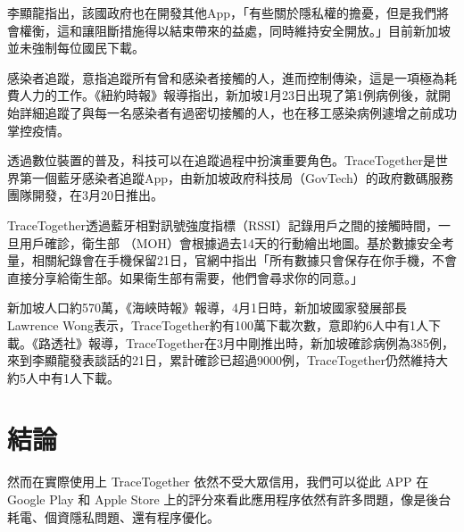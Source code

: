 \documentclass[12pt, a4paper]{report}
\begin{document}
李顯龍指出，該國政府也在開發其他App，「有些關於隱私權的擔憂，但是我們將會權衡，這和讓阻斷措施得以結束帶來的益處，同時維持安全開放。」目前新加坡並未強制每位國民下載。

感染者追蹤，意指追蹤所有曾和感染者接觸的人，進而控制傳染，這是一項極為耗費人力的工作。《紐約時報》報導指出，新加坡1月23日出現了第1例病例後，就開始詳細追蹤了與每一名感染者有過密切接觸的人，也在移工感染病例遽增之前成功掌控疫情。

透過數位裝置的普及，科技可以在追蹤過程中扮演重要角色。TraceTogether是世界第一個藍牙感染者追蹤App，由新加坡政府科技局（GovTech）的政府數碼服務團隊開發，在3月20日推出。

TraceTogether透過藍牙相對訊號強度指標（RSSI）記錄用戶之間的接觸時間，一旦用戶確診，衛生部 （MOH）會根據過去14天的行動繪出地圖。基於數據安全考量，相關紀錄會在手機保留21日，官網中指出「所有數據只會保存在你手機，不會直接分享給衛生部。如果衛生部有需要，他們會尋求你的同意。」

新加坡人口約570萬，《海峽時報》報導，4月1日時，新加坡國家發展部長Lawrence Wong表示，TraceTogether約有100萬下載次數，意即約6人中有1人下載。《路透社》報導，TraceTogether在3月中剛推出時，新加坡確診病例為385例，來到李顯龍發表談話的21日，累計確診已超過9000例，TraceTogether仍然維持大約5人中有1人下載。

\part{結論}

然而在實際使用上 TraceTogether 依然不受大眾信用，我們可以從此 APP 在 Google Play 和 Apple Store 上的評分來看此應用程序依然有許多問題，像是後台耗電、個資隱私問題、還有程序優化。
\end{document}
